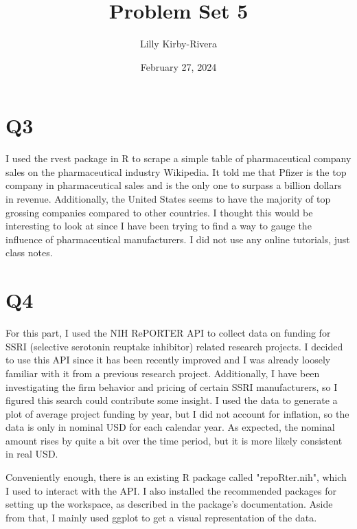 \documentclass{article}
\title{Problem Set 5}
\author{Lilly Kirby-Rivera}
\date{February 27, 2024}
\begin{document}
\maketitle

\section*{Q3}
I used the rvest package in R to scrape a simple table of pharmaceutical company sales on the pharmaceutical industry Wikipedia. It told me that Pfizer is the top company in pharmaceutical sales and is the only one to surpass a billion dollars in revenue. Additionally, the United States seems to have the majority of top grossing companies compared to other countries. I thought this would be interesting to look at since I have been trying to find a way to gauge the influence of pharmaceutical manufacturers. I did not use any online tutorials, just class notes.

\section*{Q4}
For this part, I used the NIH RePORTER API to collect data on funding for SSRI (selective serotonin reuptake inhibitor) related research projects. I decided to use this API since it has been recently improved and I was already loosely familiar with it from a previous research project. Additionally, I have been investigating the firm behavior and pricing of certain SSRI manufacturers, so I figured this search could contribute some insight. I used the data to generate a plot of average project funding by year, but I did not account for inflation, so the data is only in nominal USD for each calendar year. As expected, the nominal amount rises by quite a bit over the time period, but it is more likely consistent in real USD.
\par Conveniently enough, there is an existing R package called "repoRter.nih", which I used to interact with the API. I also installed the recommended packages for setting up the workspace, as described in the package's documentation. Aside from that, I mainly used ggplot to get a visual representation of the data.
\end{document}

